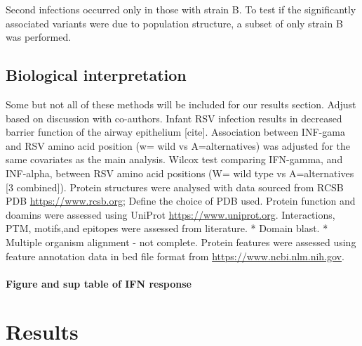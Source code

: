 \documentclass{article}
\begin{document}
Second infections occurred only in those with strain B. 
To test if the significantly associated variants were due to population structure, 
a subset of only strain B was performed. 

\subsection{Biological interpretation}
Some but not all of these methods will be included for our results section. 
Adjust based on discussion with co-authors.
Infant RSV infection results in decreased barrier function of the airway epithelium [cite].
Association between INF-gama and RSV amino acid position (w= wild vs A=alternatives) was adjusted for the same covariates as the main analysis. Wilcox test comparing IFN-gamma, and INF-alpha, between RSV amino acid positions (W= wild type vs A=alternatives [3 combined]).
Protein structures were analysed with data sourced from 
RCSB PDB \url{https://www.rcsb.org}; Define the choice of PDB used. 
Protein function and doamins were assessed using 
UniProt	\url{https://www.uniprot.org}.
Interactions, PTM, motifs,and epitopes were assessed from literature. 
* Domain blast. 
* Multiple organism alignment - not complete.
Protein features were assessed using feature annotation data in bed file format from 
\url{https://www.ncbi.nlm.nih.gov}.
\paragraph{Figure and sup table of IFN response}

\section{Results}
\end{document}

